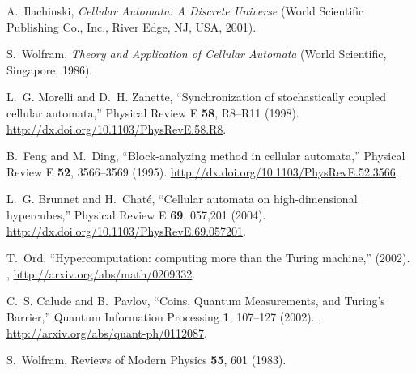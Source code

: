 \documentclass[pre,amssymb,showpacs,showkeys,preprint]{revtex4}
\begin{document}
\begin{thebibliography}{10}
A.~Ilachinski, \emph{Cellular Automata: A Discrete Universe} (World Scientific
  Publishing Co., Inc., River Edge, NJ, USA, 2001).

S.~Wolfram, \emph{Theory and Application of Cellular Automata} (World
  Scientific, Singapore, 1986).

L.~G. Morelli and D.~H. Zanette, \enquote{Synchronization of stochastically
  coupled cellular automata,} Physical Review E \textbf{58}, R8--R11 (1998).
  \urlprefix\url{http://dx.doi.org/10.1103/PhysRevE.58.R8}.

B.~Feng and M.~Ding, \enquote{Block-analyzing method in cellular automata,}
  Physical Review E \textbf{52}, 3566--3569 (1995).
  \urlprefix\url{http://dx.doi.org/10.1103/PhysRevE.52.3566}.

L.~G. Brunnet and H.~Chat{\'{e}}, \enquote{Cellular automata on
  high-dimensional hypercubes,} Physical Review E \textbf{69}, 057,201 (2004).
  \urlprefix\url{http://dx.doi.org/10.1103/PhysRevE.69.057201}.

T.~Ord, \enquote{Hypercomputation: computing more than the Turing machine,}
  (2002). ,
  \urlprefix\url{http://arxiv.org/abs/math/0209332}.

C.~S. Calude and B.~Pavlov, \enquote{Coins, Quantum Measurements, and
  {T}uring's Barrier,} Quantum Information Processing \textbf{1}, 107--127
  (2002). ,
  \urlprefix\url{http://arxiv.org/abs/quant-ph/0112087}.

S.~Wolfram, Reviews of Modern Physics \textbf{55}, 601 (1983).

\end{thebibliography}
\end{document}
